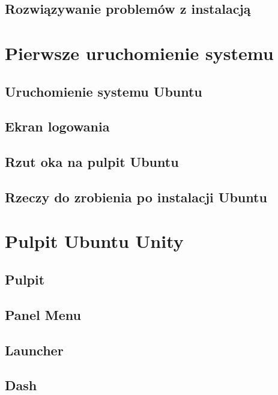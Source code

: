 \documentclass[a4paper,11pt,oneside]{mwart}
\begin{document}
        \subsection{Rozwiązywanie problemów z instalacją}
                                 
\section{Pierwsze uruchomienie systemu}
        \label{sec:pierwsze_uruchomienie}
        \subsection{Uruchomienie systemu Ubuntu}
                
        \subsection{Ekran logowania}
                
        \subsection{Rzut oka na pulpit Ubuntu}
                
        \subsection{Rzeczy do zrobienia po instalacji Ubuntu}
                \label{sec:rzeczy_do_zrobienia_po_instalacji}
                
\section{Pulpit Ubuntu Unity}
		
        \label{pulpit_unity}
        \subsection{Pulpit}
        		       
        \subsection{Panel Menu}
        		
        \subsection{Launcher}
        		
        \subsection{Dash}
        		
\end{document}
